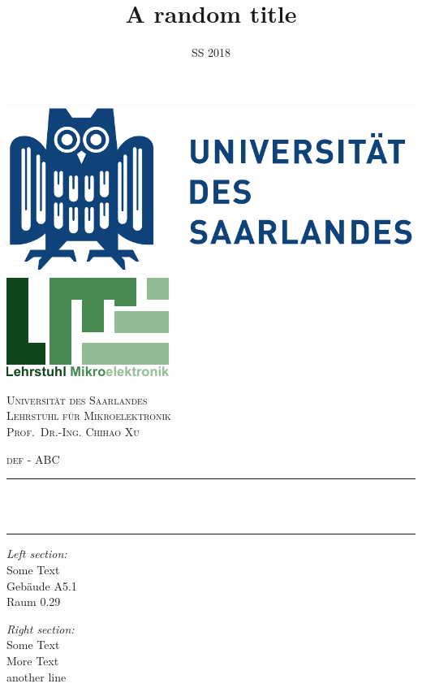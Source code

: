 
\title{A random title}
\date{SS 2018}

\begin{titlepage}
	\centering
	\vspace*{-2.0 cm}
	\includegraphics[scale = 0.5]{inc/img/title/uds.pdf} \hspace{10em}
	\includegraphics[scale = 1.25]{inc/img/title/lme.pdf}
	\vfill
	\begin{singlespace}
	\textsc{\LARGE Universität des Saarlandes} \\ [0.5 cm]
	\textsc{\LARGE Lehrstuhl für Mikroelektronik} \\ [0.5 cm]
	\textsc{\LARGE Prof.\ Dr.-Ing. Chihao Xu} \\ [1 cm]
	\end{singlespace}
	\vfill
	\textsc{\huge def - ABC}
	\vfill
	\rule{\linewidth}{0.2 mm} \\ [0.3 cm]
	\doublespacing{\huge \textbf \thetitle} \\
	\rule{\linewidth}{0.2 mm}
	\vfill
	
	\begin{onehalfspace}
		\begin{minipage}[t]{0.43\textwidth}
			\begin{flushleft}
				\emph{\large Left section:} \\ [0.3em]
				Some Text \\
				Gebäude A5.1\\
				Raum 0.29\\
			\end{flushleft}
		\end{minipage}

		\begin{minipage}[t]{0.43\textwidth}
			\begin{flushright}
				\emph{\large Right section:} \\[0.3em]
				Some Text \\
				More Text \\
				another line \\
			\end{flushright}
		\end{minipage}\vfill
	\end{onehalfspace}

\end{titlepage}
